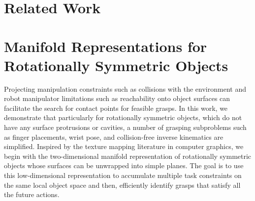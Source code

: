 \documentclass{aamas2015}
\begin{document}
%	
%	
\newpage
\section{Related Work}

\newpage
\section{Manifold Representations for \\Rotationally Symmetric Objects}

Projecting manipulation constraints such as collisions with the environment and robot
manipulator limitations such as reachability onto object surfaces can facilitate the search
for contact points for feasible grasps. In this work, we demonstrate that particularly for rotationally
symmetric objects, which do not have any surface protrusions or cavities, a number of grasping subproblems
such as finger placements, wrist pose, and collision-free inverse kinematics are simplified. 
Inspired by the texture mapping literature in computer graphics, we begin with the two-dimensional manifold
representation of rotationally symmetric objects whose surfaces can be unwrapped
into simple planes. The goal is to use this low-dimensional representation to accumulate
multiple task constraints on the same local object space and then, efficiently identify 
grasps that satisfy all the future actions. 
\end{document}
